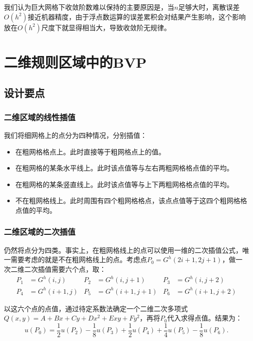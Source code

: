 \documentclass[lang=cn,10pt]{elegantbook}
\begin{document}
我们认为巨大网格下收敛阶数难以保持的主要原因是，当$n$足够大时，离散误差$O(h^2)$接近机器精度，由于浮点数运算的误差累积会对结果产生影响，这个影响放在$O(h^2)$尺度下就显得相当大，导致收敛阶无规律。

\newpage

\chapter{二维规则区域中的BVP}

\section{设计要点}

\subsection{二维区域的线性插值}

我们将细网格上的点分为四种情况，分别插值：
\begin{itemize}
  \item 在粗网格格点上。此时直接等于粗网格点上的值。
  \item 在粗网格的某条水平线上。此时该点值等与左右两粗网格格点值的平均。
  \item 在粗网格的某条竖直线上。此时该点值等与上下两粗网格格点值的平均。
  \item 不在粗网格线上。此时周围有四个粗网格格点，该点点值等于这四个粗网格格点值的平均。
\end{itemize}

\subsection{二维区域的二次插值}

仍然将点分为四类。事实上，在粗网格线上的点可以使用一维的二次插值公式，唯一需要考虑的就是不在粗网格线上的点。考虑点$P_0=G^h(2i+1,2j+1)$，做一次二维二次插值需要六个点，取：
\begin{align*}
  P_1&=G^h(i,j) & P_2&=G^h(i,j+1) & P_3&=G^h(i,j+2)\\
  P_4&=G^h(i+1,j) & P_5&=G^h(i+1,j+1) & P_6&=G^h(i+1,j+2)
\end{align*}

以这六个点的点值，通过待定系数法确定一个二维二次多项式$Q(x,y)=A+Bx+Cy+Dx^2+Exy+Fy^2$，再将$P_0$代入求得点值。结果为：
\begin{equation*}
  u(P_0)=\frac{1}{2}u(P_2)-\frac{1}{8}u(P_3)+\frac{1}{2}u(P_4)+\frac{1}{4}u(P_5)-\frac{1}{8}u(P_6).
\end{equation*}
\end{document}
